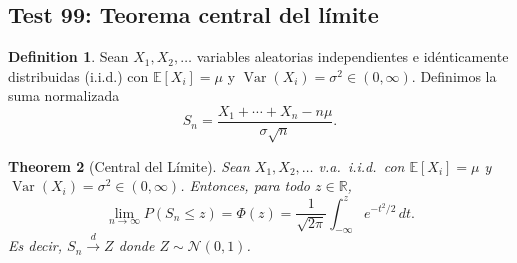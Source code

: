 \documentclass[11pt,a4paper]{article}
\theoremstyle{plain}
\newtheorem{theorem}{Theorem}[section]
\theoremstyle{definition}
\newtheorem{definition}[theorem]{Definition}
\begin{document}
\subsection*{Test 99: Teorema central del límite}

\begin{definition}
Sean $X_{1},X_{2},\dots$ variables aleatorias independientes e idénticamente distribuidas (i.i.d.) con $\mathbb{E}[X_{i}]=\mu$ y $\operatorname{Var}(X_{i})=\sigma^{2}\in(0,\infty)$. Definimos la suma normalizada
\[
S_{n}=\frac{X_{1}+\cdots+X_{n}-n\mu}{\sigma\sqrt{n}}.
\]
\end{definition}

\begin{theorem}[Central del Límite]
Sean $X_{1},X_{2},\dots$ v.a.\ i.i.d.\ con $\mathbb{E}[X_{i}]=\mu$ y $\operatorname{Var}(X_{i})=\sigma^{2}\in(0,\infty)$. Entonces, para todo $z\in\mathbb{R}$,
\[
\lim_{n\to\infty}P(S_{n}\le z)=\Phi(z)=\frac{1}{\sqrt{2\pi}}\int_{-\infty}^{z}e^{-t^{2}/2}\,dt.
\]
Es decir, $S_{n}\xrightarrow{d}Z$ donde $Z\sim\mathcal{N}(0,1)$.
\end{theorem}
\end{document}
